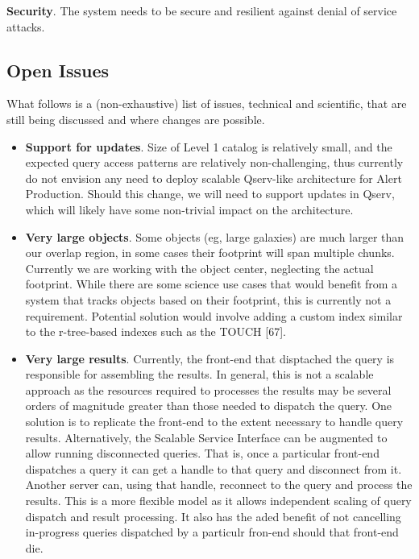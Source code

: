 \documentclass[DM,lsstdraft,toc]{lsstdoc}
\begin{document}
\textbf{Security}. The system needs to be secure and resilient against
denial of service attacks.

\subsection{Open Issues}\label{open-issues}

What follows is a (non-exhaustive) list of issues, technical and
scientific, that are still being discussed and where changes are
possible.

\begin{itemize}
\item
  \textbf{Support for updates}. Size of Level 1 catalog is relatively
  small, and the expected query access patterns are relatively
  non-challenging, thus currently do not envision any need to deploy
  scalable Qserv-like architecture for Alert Production. Should this
  change, we will need to support updates in Qserv, which will likely
  have some non-trivial impact on the architecture.
\item
  \textbf{Very large objects}. Some objects (eg, large galaxies) are
  much larger than our overlap region, in some cases their footprint
  will span multiple chunks. Currently we are working with the object
  center, neglecting the actual footprint. While there are some science
  use cases that would benefit from a system that tracks objects based
  on their footprint, this is currently not a requirement. Potential
  solution would involve adding a custom index similar to the
  r-tree-based indexes such as the TOUCH {[}67{]}.
\item
  \textbf{Very large results}. Currently, the front-end that disptached
  the query is responsible for assembling the results. In general, this
  is not a scalable approach as the resources required to processes the
  results may be several orders of magnitude greater than those needed
  to dispatch the query. One solution is to replicate the front-end to
  the extent necessary to handle query results. Alternatively, the
  Scalable Service Interface can be augmented to allow running
  disconnected queries. That is, once a particular front-end dispatches
  a query it can get a handle to that query and disconnect from it.
  Another server can, using that handle, reconnect to the query and
  process the results. This is a more flexible model as it allows
  independent scaling of query dispatch and result processing. It also
  has the aded benefit of not cancelling in-progress queries dispatched
  by a particulr fron-end should that front-end die.
\end{itemize}
\end{document}
